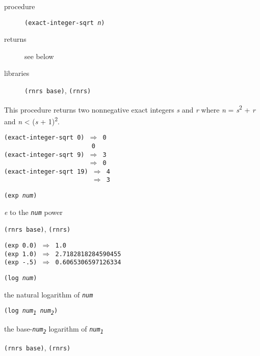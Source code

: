 \begin{description}

\label{objects_s128}\item[procedure] \texttt{(exact-integer-sqrt \textit{n})}



\item[returns] see below


\item[libraries] \texttt{(rnrs base)}, \texttt{(rnrs)}
\end{description}


This procedure returns two nonnegative exact integers \textit{s} and \textit{r} where
\textit{n} = \textit{s}\textsuperscript{2} + \textit{r} and \textit{n} \textless{} (\textit{s} + 1)\textsuperscript{2}.


\begin{alltt}
(exact-integer-sqrt 0) \(\Rightarrow\) 0
                        0
(exact-integer-sqrt 9) \(\Rightarrow\) 3
                       \(\Rightarrow\) 0
(exact-integer-sqrt 19) \(\Rightarrow\) 4
                        \(\Rightarrow\) 3
\end{alltt}

\begin{description}

\label{objects_s129}\item[procedure] \texttt{(exp \textit{num})}



\item[returns] \textit{e} to the \texttt{\textit{num}} power


\item[libraries] \texttt{(rnrs base)}, \texttt{(rnrs)}
\end{description}


\begin{alltt}
(exp 0.0) \(\Rightarrow\) 1.0
(exp 1.0) \(\Rightarrow\) 2.7182818284590455
(exp -.5) \(\Rightarrow\) 0.6065306597126334
\end{alltt}

\begin{description}

\label{objects_s130}\item[procedure] \texttt{(log \textit{num})}



\item[returns] the natural logarithm of \texttt{\textit{num}}


\item[procedure] \texttt{(log \textit{num\textsubscript{1}} \textit{num\textsubscript{2}})}



\item[returns] the base-\texttt{\textit{num\textsubscript{2}}} logarithm of \texttt{\textit{num\textsubscript{1}}}


\item[libraries] \texttt{(rnrs base)}, \texttt{(rnrs)}
\end{description}


